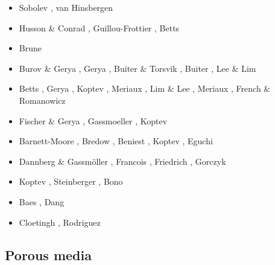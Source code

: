\begin{scriptsize}
\begin{itemize}
\item[\twothousandeleven] Sobolev \etal \cite{sosk11}, van Hinsbergen \etal \cite{vasd11}
\item[\twothousandtwelve] Husson \& Conrad \cite{huco12}, Guillou-Frottier \etal \cite{gubc12},
                          Betts \etal \cite{bemm12}
\item[\twothousandthirteen] Brune \etal \cite{brps13}
\item[\twothousandfourteen] Burov \& Gerya \cite{buge14}, Gerya \cite{gery14b},
                            Buiter \& Torsvik \cite{buto14}, Buiter \cite{buit14},
                            Lee \& Lim \cite{leli14}
\item[\twothousandfifteen] Betts \etal \cite{bemm15}, Gerya \etal \cite{gesb15},
                           Koptev \etal \cite{kocb15}, Meriaux \etal \cite{meds15},
                           Lim \& Lee \cite{lile15}, Meriaux \etal \cite{medd15},
                           French \& Romanowicz \cite{frro15}
\item[\twothousandsixteen] Fischer \& Gerya \cite{fige16}, Gassmoeller \etal \cite{gadb16},
                           Koptev \etal \cite{kobc16}
\item[\twothousandseventeen] Barnett-Moore \etal \cite{bahf17}, Bredow \etal \cite{brsg17},
                             Beniest \etal \cite{bekb17}, Koptev \etal \cite{kocb17},
                             Eguchi \etal \cite{egim17}
\item[\twothousandeighteen] Dannberg \& Gassm\"oller \cite{daga18}, Francois \etal \cite{frkc18},
                            Friedrich \etal \cite{frbr18}, Gorczyk \etal \cite{gomb18}
\item[\twothousandnineteen] Koptev \etal \cite{kobg19}, Steinberger \etal \cite{stbl19},
                            Bono \etal \cite{botb19}
\item[\twothousandtwenty] Baes \etal \cite{basg20,basg20b}, Dang \etal \cite{dazl20}
\item[\twothousandtwentyone] Cloetingh \etal \cite{clkk21}, Rodriguez \etal \cite{roac21}
\end{itemize}
\end{scriptsize}

\subsection{Porous media} 

